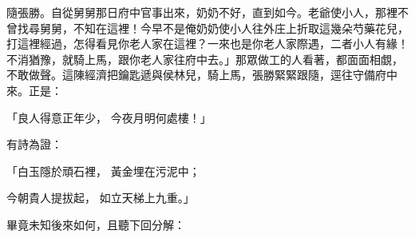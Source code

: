 \begin{showcontents}{}
隨張勝。自從舅舅那日府中官事出來，奶奶不好，直到如今。老爺使小人，那裡不曾找尋舅舅，不知在這裡！今早不是俺奶奶使小人往外庄上折取這幾朵芍藥花兒，打這裡經過，怎得看見你老人家在這裡？一來也是你老人家際遇，二者小人有緣！不消猶豫，就騎上馬，跟你老人家往府中去。」那眾做工的人看著，都面面相覷，不敢做聲。這陳經濟把鑰匙遞與侯林兒，騎上馬，張勝緊緊跟隨，逕往守備府中來。正是：

「良人得意正年少，  今夜月明何處樓！」

有詩為證：

「白玉隱於頑石裡，  黃金埋在污泥中；

今朝貴人提拔起，  如立天梯上九重。」

畢竟未知後來如何，且聽下回分解：





\end{showcontents}


